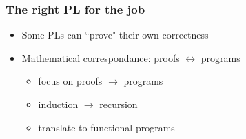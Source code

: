 
\begin{frame}

\frametitle{The right PL for the job}

\begin{itemize}

\item<1-> Some PLs can ``prove" their own correctness

\item<2-> Mathematical correspondance: proofs $\longleftrightarrow$ programs

\begin{itemize}

\item focus on proofs $\longrightarrow$ programs

\item induction $\longrightarrow$ recursion

\item translate to functional programs


\end{itemize}
\end{itemize}
\end{frame}
